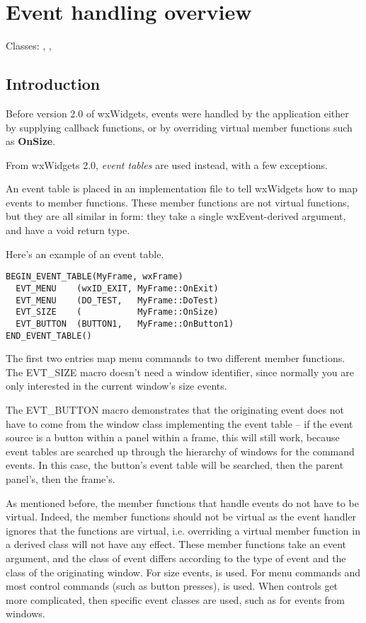 \section{Event handling overview}\label{eventhandlingoverview}

Classes: , , 

\subsection{Introduction}\label{eventintroduction}

Before version 2.0 of wxWidgets, events were handled by the application
either by supplying callback functions, or by overriding virtual member
functions such as {\bf OnSize}.

From wxWidgets 2.0, {\it event tables} are used instead, with a few exceptions.

An event table is placed in an implementation file to tell wxWidgets how to map
events to member functions. These member functions are not virtual functions, but
they are all similar in form: they take a single wxEvent-derived argument, and have a void return
type.

Here's an example of an event table.

\begin{verbatim}
BEGIN_EVENT_TABLE(MyFrame, wxFrame)
  EVT_MENU    (wxID_EXIT, MyFrame::OnExit)
  EVT_MENU    (DO_TEST,   MyFrame::DoTest)
  EVT_SIZE    (           MyFrame::OnSize)
  EVT_BUTTON  (BUTTON1,   MyFrame::OnButton1)
END_EVENT_TABLE()
\end{verbatim}

The first two entries map menu commands to two different member functions. The
EVT\_SIZE macro doesn't need a window identifier, since normally you are only
interested in the current window's size events.

The EVT\_BUTTON macro demonstrates that the originating event does not have to
come from the window class implementing the event table -- if the event source
is a button within a panel within a frame, this will still work, because event
tables are searched up through the hierarchy of windows for the command events.
In this case, the button's event table will be searched, then the parent
panel's, then the frame's.

As mentioned before, the member functions that handle events do not have to be
virtual. Indeed, the member functions should not be virtual as the event
handler ignores that the functions are virtual, i.e. overriding a virtual
member function in a derived class will not have any effect. These member
functions take an event argument, and the class of event differs according to
the type of event and the class of the originating window. For size events, 
 is used. For menu commands and most
control commands (such as button presses), 
 is used. When controls get more
complicated, then specific event classes are used, such as 
 for events from 
 windows.

